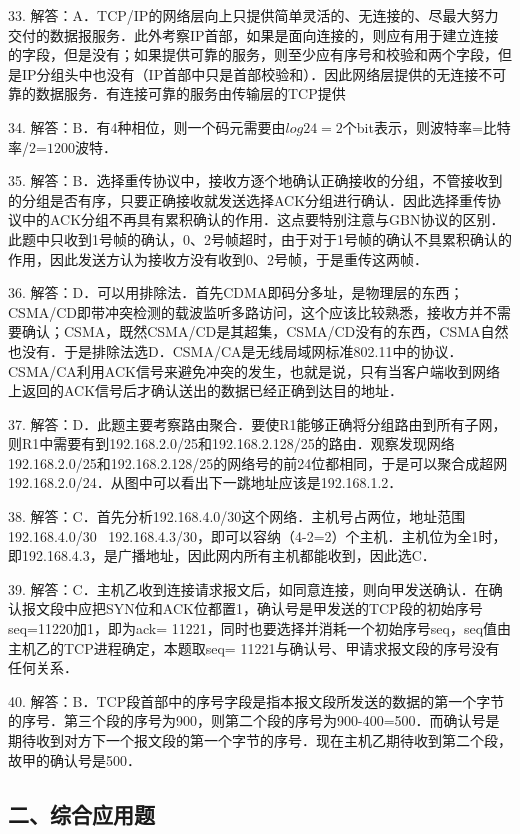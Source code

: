33. 解答：A．TCP/IP的网络层向上只提供简单灵活的、无连接的、尽最大努力交付的数据报服务．此外考察IP首部，如果是面向连接的，则应有用于建立连接的字段，但是没有；如果提供可靠的服务，则至少应有序号和校验和两个字段，但是IP分组头中也没有（IP首部中只是首部校验和）．因此网络层提供的无连接不可靠的数据服务．有连接可靠的服务由传输层的TCP提供

34. 解答：B．有$4$种相位，则一个码元需要由$log24=2$个bit表示，则波特率=比特率/$2$=$1200$波特．

35. 解答：B．选择重传协议中，接收方逐个地确认正确接收的分组，不管接收到的分组是否有序，只要正确接收就发送选择ACK分组进行确认．因此选择重传协议中的ACK分组不再具有累积确认的作用．这点要特别注意与GBN协议的区别．此题中只收到1号帧的确认，0、2号帧超时，由于对于1号帧的确认不具累积确认的作用，因此发送方认为接收方没有收到0、2号帧，于是重传这两帧．

36. 解答：D．可以用排除法．首先CDMA即码分多址，是物理层的东西；CSMA/CD即带冲突检测的载波监听多路访问，这个应该比较熟悉，接收方并不需要确认；CSMA，既然CSMA/CD是其超集，CSMA/CD没有的东西，CSMA自然也没有．于是排除法选D．CSMA/CA是无线局域网标准802.11中的协议．CSMA/CA利用ACK信号来避免冲突的发生，也就是说，只有当客户端收到网络上返回的ACK信号后才确认送出的数据已经正确到达目的地址．

37. 解答：D．此题主要考察路由聚合．要使R1能够正确将分组路由到所有子网，则R1中需要有到192.168.2.0/25和192.168.2.128/25的路由．观察发现网络192.168.2.0/25和192.168.2.128/25的网络号的前24位都相同，于是可以聚合成超网192.168.2.0/24．从图中可以看出下一跳地址应该是192.168.1.2．

38. 解答：C．首先分析192.168.4.0/30这个网络．主机号占两位，地址范围192.168.4.0/30~ 192.168.4.3/30，即可以容纳（4-2=2）个主机．主机位为全1时，即192.168.4.3，是广播地址，因此网内所有主机都能收到，因此选C．

39. 解答：C．主机乙收到连接请求报文后，如同意连接，则向甲发送确认．在确认报文段中应把SYN位和ACK位都置1，确认号是甲发送的TCP段的初始序号seq=11220加1，即为ack= 11221，同时也要选择并消耗一个初始序号seq，seq值由主机乙的TCP进程确定，本题取seq= 11221与确认号、甲请求报文段的序号没有任何关系．

40. 解答：B．TCP段首部中的序号字段是指本报文段所发送的数据的第一个字节的序号．第三个段的序号为900，则第二个段的序号为900-400=500．而确认号是期待收到对方下一个报文段的第一个字节的序号．现在主机乙期待收到第二个段，故甲的确认号是500．


\subsection{二、综合应用题}

